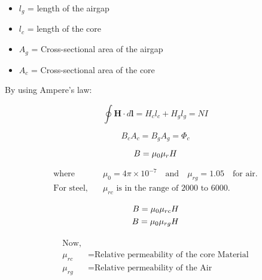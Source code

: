 \documentclass{article}
\begin{document}
\huge
\begin{itemize}
    \item \( l_g \) = length of the airgap
    \item \( l_c \) = length of the core
    \item \( A_g \) = Cross-sectional area of the airgap
    \item \( A_c \) = Cross-sectional area of the core
\end{itemize}

By using Ampere's law:

\begin{equation}
    \oint \mathbf{H} \cdot d\mathbf{l} = H_c l_c + H_g l_g = NI \tag{1}
\end{equation}





\begin{equation}
    B_c A_c = B_g A_g = \Phi_c \tag{2}
\end{equation}

\vspace{0.5cm} %
\begin{equation*}
   \Huge  {B} = \mu_0 \mu_r {H}
\end{equation*}

\begin{align*}
\text{where} \quad & \mu_0 = 4 \pi \times 10^{-7} \quad \text{and} \quad \mu_{rg} = 1.05 \quad \text{for air}. \\
\text{For steel,} \quad & \mu_{rc} \text{ is in the range of } 2000 \text{ to } 6000.
\end{align*}

\vspace{0.5cm} %
\begin{equation*}
\begin{split}
   \Huge  {B} = \mu_0 \mu_{rc} {H}\\
  \Huge  {B} = \mu_0 \mu_{rg} {H}
\end{split}
\end{equation*}




\begin{equation*}
\begin{split}
\begin{aligned}
\text{Now,} \\
\mu_{rc} &= \text{Relative permeability of the core Material}\\
\mu_{rg} &= \text{Relative permeability of the Air}
\end{aligned}
\end{split}
\end{equation*}
\end{document}
